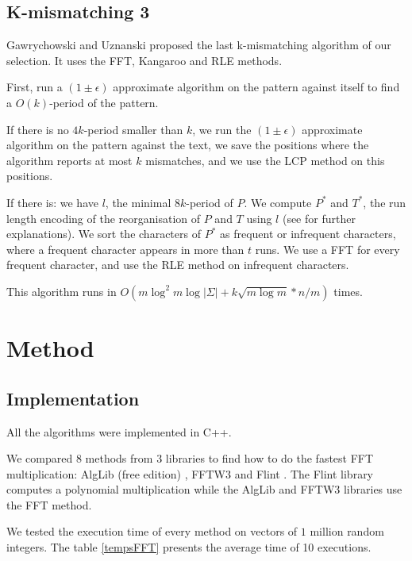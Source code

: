 \documentclass[preprint,12pt]{elsarticle}
\begin{document}
\subsection{K-mismatching 3}
Gawrychowski and Uznanski\cite{Kmism3} proposed the last k-mismatching algorithm of our selection.
It uses the FFT, Kangaroo and RLE methods. 

First, run a $(1 \pm \epsilon)$ approximate algorithm on the pattern against itself
to find a $O(k)$-period of the pattern.

If there is no $4k$-period smaller than $k$,
we run the $(1 \pm \epsilon)$ approximate algorithm on the pattern against the text,
we save the positions where the algorithm reports at most $k$ mismatches,
and we use the LCP method on this positions. 

If there is: we have $l$, the minimal $8k$-period of $P$.
We compute $P^*$ and $T^*$, the run length encoding of the reorganisation of $P$ and $T$ using $l$
(see \cite{Kmism3} for further explanations).
We sort the characters of $P^*$ as frequent or infrequent characters,
where a frequent character appears in more than $t$ runs.
We use a FFT for every frequent character,
and use the RLE method on infrequent characters.

This algorithm runs in $O(m \log^2 m \log |\Sigma| +k \sqrt{m \log m} * n/m)$ times.










\section{Method}
\label{Method}

\subsection*{Implementation}

All the algorithms were implemented in C++.

We compared $8$ methods from $3$ libraries to find how to do the fastest FFT multiplication:
AlgLib (free edition) \cite{alglib}, FFTW3 \cite{FFTW05} and Flint \cite{Hart2010}.
The Flint library computes a polynomial multiplication while
the AlgLib and FFTW3 libraries use the FFT method. %

We tested the execution time of every method on vectors of $1$ million random integers.
The table \ref{tempsFFT} presents the average time of 10 executions.
\end{document}

